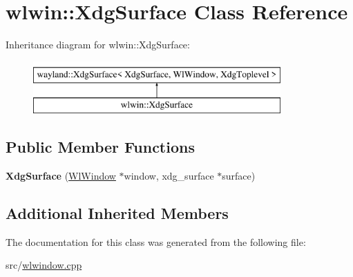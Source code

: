 \hypertarget{classwlwin_1_1XdgSurface}{}\section{wlwin\+::Xdg\+Surface Class Reference}
\label{classwlwin_1_1XdgSurface}
Inheritance diagram for wlwin\+::Xdg\+Surface\+:\begin{figure}[H]
\begin{center}
\leavevmode
\includegraphics[height=2.000000cm]{classwlwin_1_1XdgSurface}
\end{center}
\end{figure}
\subsection*{Public Member Functions}
\begin{DoxyCompactItemize}
\item 
\mbox{\label{classwlwin_1_1XdgSurface_a752c7e979d90903313337248de6f89e1}} 
{\bfseries Xdg\+Surface} (\mbox{\hyperlink{classwlwin_1_1WlWindow}{Wl\+Window}} $\ast$window, xdg\+\_\+surface $\ast$surface)
\end{DoxyCompactItemize}
\subsection*{Additional Inherited Members}


The documentation for this class was generated from the following file\+:\begin{DoxyCompactItemize}
\item 
src/\mbox{\hyperlink{wlwindow_8cpp}{wlwindow.\+cpp}}\end{DoxyCompactItemize}
